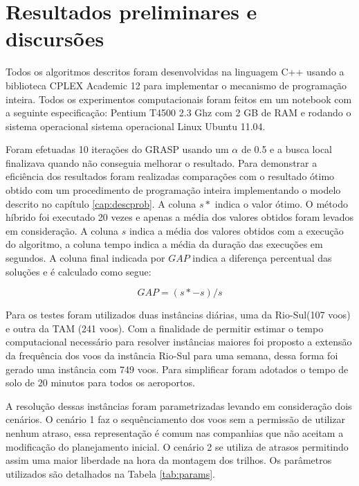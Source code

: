   \chapter{Resultados preliminares e discursões}

Todos os algoritmos descritos foram desenvolvidas na linguagem C++ usando a biblioteca CPLEX Academic 12 para implementar o mecanismo de programação inteira. Todos os experimentos computacionais foram feitos em um notebook com a seguinte especificação: Pentium T4500 2.3 Ghz com 2 GB de RAM e rodando o sistema operacional sistema operacional Linux Ubuntu 11.04.

Foram efetuadas 10 iterações do GRASP usando um $\alpha$ de 0.5 e a busca local finalizava quando não conseguia melhorar o resultado. Para demonstrar a eficiência dos resultados foram realizadas comparações com o resultado ótimo obtido com um procedimento de programação inteira implementando o modelo descrito no capítulo \ref{cap:descprob}. A coluna $s*$ indica o valor ótimo. O método híbrido foi executado 20 vezes e apenas a média dos valores obtidos foram levados em consideração. A coluna $s$ indica a média dos valores obtidos com a execução do algoritmo, a coluna tempo indica a média da duração das execuções em segundos. A coluna final indicada por $GAP$ indica a diferença percentual das soluções e é calculado como segue:

\[  GAP = (s* - s)/s \]

Para os testes foram utilizados duas instâncias diárias, uma da Rio-Sul(107 voos) e outra da TAM (241 voos).  Com a finalidade de permitir estimar o tempo computacional necessário para resolver instâncias maiores foi proposto a extensão da frequência dos voos da instância Rio-Sul para uma semana, dessa forma foi gerado uma instância com 749 voos. Para simplificar foram adotados o tempo de solo de 20 minutos para todos os aeroportos.

A resolução dessas instâncias foram parametrizadas levando em consideração dois cenários. O cenário 1 faz o sequênciamento dos voos sem a permissão de utilizar nenhum atraso, essa representação é comum nas companhias que não aceitam a modificação do planejamento inicial. O cenário 2 se utiliza de atrasos permitindo assim uma maior liberdade na hora da montagem dos trilhos. Os parâmetros utilizados são detalhados na Tabela \ref{tab:params}.

